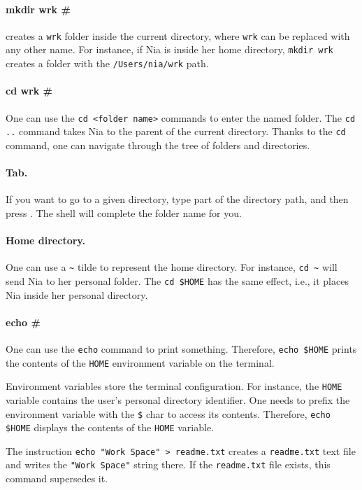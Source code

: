 \documentclass[a4paper,12pt]{book}
\begin{document}
\paragraph{mkdir wrk \#}
creates a \verb|wrk|
folder inside the current directory,
where \verb|wrk| can be replaced
with any other name.
For instance, if Nia is inside her
home directory, \verb|mkdir wrk| creates
a folder with the \verb|/Users/nia/wrk| path.

\paragraph{cd wrk \#} 
One can use the
\verb|cd <folder name>| commands to enter
the named folder.
The \verb|cd ..|  command
takes Nia to the parent of the current
directory.
Thanks to the \verb|cd|
command, one can navigate through the
tree of folders and directories.

\paragraph{Tab.} If you want to go
to a given directory, type part of the directory
path, and then press .
The shell will complete the folder name for you.

\paragraph{Home directory.} One
can use a \verb|~| tilde to represent
the home directory. For instance,
\verb|cd ~| will send Nia to her
personal folder. The \verb|cd $HOME| has
the same effect, i.e., it places Nia inside
her personal directory.

\paragraph{echo \#} One can use the
\verb|echo| command to print something.
Therefore, \verb|echo $HOME| prints
the contents of the \verb|HOME|
environment variable on the terminal.

Environment variables store
the terminal configuration. For instance,
the \verb|HOME| variable contains
the user's personal directory identifier.
One needs to prefix the environment
variable with the \verb|$| char
to access its contents. Therefore,
\verb|echo $HOME| displays the
contents of the \verb|HOME| variable.

The instruction \verb|echo "Work Space" > readme.txt|
creates a \verb|readme.txt| text file and
writes the \verb|"Work Space"| string there.
If the \verb|readme.txt| file exists,
this command supersedes it.
\end{document}
